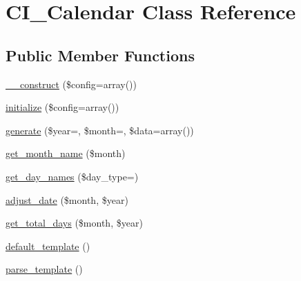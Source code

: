 \hypertarget{class_c_i___calendar}{}\section{C\+I\+\_\+\+Calendar Class Reference}
\label{class_c_i___calendar}
\subsection*{Public Member Functions}
\begin{DoxyCompactItemize}
\item 
\mbox{\hyperlink{class_c_i___calendar_af7f9493844d2d66e924e3c1df51ce616}{\+\_\+\+\_\+construct}} (\$config=array())
\item 
\mbox{\hyperlink{class_c_i___calendar_a481385e36d920f5a5005ace05c6cd016}{initialize}} (\$config=array())
\item 
\mbox{\hyperlink{class_c_i___calendar_aabfc9d516a481b11230cd6562f6809f2}{generate}} (\$year=\textquotesingle{}\textquotesingle{}, \$month=\textquotesingle{}\textquotesingle{}, \$data=array())
\item 
\mbox{\hyperlink{class_c_i___calendar_a056208e620b0ffc2525a07d8646eb194}{get\+\_\+month\+\_\+name}} (\$month)
\item 
\mbox{\hyperlink{class_c_i___calendar_a31e09ae5dac8a808676ebddab1e735cc}{get\+\_\+day\+\_\+names}} (\$day\+\_\+type=\textquotesingle{}\textquotesingle{})
\item 
\mbox{\hyperlink{class_c_i___calendar_ac216356ab0ff31e8538fd9208a26577a}{adjust\+\_\+date}} (\$month, \$year)
\item 
\mbox{\hyperlink{class_c_i___calendar_a3c863f62907e445af2711df11fb90ff9}{get\+\_\+total\+\_\+days}} (\$month, \$year)
\item 
\mbox{\hyperlink{class_c_i___calendar_a5d174710ed7a2a08df21dbaa2bb6a50f}{default\+\_\+template}} ()
\item 
\mbox{\hyperlink{class_c_i___calendar_ac0331959620d18320ab6587621730d44}{parse\+\_\+template}} ()
\end{DoxyCompactItemize}
